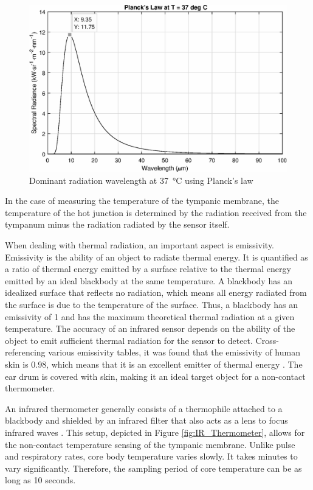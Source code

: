 \begin{figure}[h]
   \centering
   \includegraphics[scale=0.6]{figs/PlancksLaw}
   \caption{Dominant radiation wavelength at \SI{37}{\celsius} using Planck's law}
   \label{fig:PlancksLaw}
\end{figure}

In the case of measuring the temperature of the tympanic membrane, the temperature of the hot junction is determined by the radiation received from the tympanum minus the radiation radiated by the sensor itself.

\medskip

When dealing with thermal radiation, an important aspect is emissivity. Emissivity is the ability of an object to radiate thermal energy. It is quantified as a ratio of thermal energy emitted by a surface relative to the thermal energy emitted by an ideal blackbody at the same temperature. A blackbody has an idealized surface that reflects no radiation, which means all energy radiated from the surface is due to the temperature of the surface. Thus, a blackbody has an emissivity of 1 and has the maximum theoretical thermal radiation at a given temperature. The accuracy of an infrared sensor depends on the ability of the object to emit sufficient thermal radiation for the sensor to detect. Cross-referencing various emissivity tables, it was found that the emissivity of human skin is 0.98, which means that it is an excellent emitter of thermal energy \citep{stumme2003emissivity, EmissivityThermoWorks, EmissivityOptotherm}. The ear drum is covered with skin, making it an ideal target object for a non-contact thermometer.

\medskip

An infrared thermometer generally consists of a thermophile attached to a blackbody and shielded by an infrared filter that also acts as a lens to focus infrared waves \citep{irTempSensors}. This setup, depicted in Figure \ref{fig:IR_Thermometer}, allows for the non-contact temperature sensing of the tympanic membrane. Unlike pulse and respiratory rates, core body temperature varies slowly. It takes minutes to vary significantly. Therefore, the sampling period of core temperature can be as long as 10 seconds.

